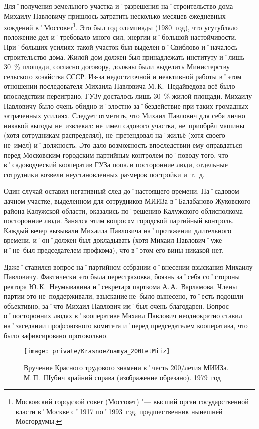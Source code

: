 Для˚получения земельного участка и˚разрешения на˚строительство дома Михаилу Павловичу пришлось затратить несколько месяцев ежедневных хождений в˚Моссовет\footnote{Московский городской совет (Моссовет) "--- высший орган государственной власти в˚Москве с˚1917 по˚1993~год, предшественник нынешней Мосгордумы.}. Это был год олимпиады (1980~год), что усугубляло положение дел и˚требовало много сил, энергии и˚большой настойчивости. При˚больших усилиях такой участок был выделен в˚Свиблово и˚началось строительство дома. Жилой дом должен был принадлежать институту и˚лишь 30~\% площади, согласно договору, должны были выделить Министерству сельского хозяйства СССР. Из-за недостаточной и неактивной работы в˚этом отношении последователя Михаила Павловича М.\,К.~Недайведова всё было впоследствии переиграно. ГУЗу досталось лишь 30~\% жилой площади. Михаилу Павловичу было очень обидно и˚злостно за˚бездействие при таких громадных затраченных усилиях. Следует отметить, что Михаил Павлович для себя лично никакой выгоды не~извлекал: не~имел садового участка, не~приобрёл машины (хотя сотрудникам распределял), не~претендовал на˚жильё (хотя своего не~имел) и˚должность. Это дало возможность впоследствии ему оправдаться перед Московским городским партийным контролем по˚поводу того, что в˚садоводческий кооператив ГУЗа попали посторонние люди, отдельные сотрудники возвели неустановленных размеров постройки и~т.~д. 

Один случай оставил негативный след до˚настоящего времени. На˚садовом дачном участке, выделенном для сотрудников МИИЗа в˚Балабаново Жуковского района Калужской области, оказались по˚решению Калужского облисполкома посторонние люди. Занялся этим вопросом городской партийный контроль. Каждый вечер вызывали Михаила Павловича на˚протяжении длительного времени, и˚он˚должен был докладывать (хотя Михаил Павлович˚уже и˚не~был председателем профкома), что в˚этом его вины никакой нет.

Даже˚ставился вопрос на˚партийном собрании о˚внесении взыскания Михаилу Павловичу. Фактически это была перестраховка, боязнь за˚себя со˚стороны ректора Ю.\,К.~Неумывакина и˚секретаря парткома А.\,А.~Варламова. Члены партии это не~поддерживали, взыскание не~было вынесено, то˚есть подошли объективно, за˚что Михаил Павлович им˚был очень благодарен. Вопрос о˚посторонних людях в˚кооперативе Михаил Павлович неоднократно ставил на˚заседании профсоюзного комитета и˚перед председателем кооператива, что было зафиксировано протокольно.

\begin{figure}[h]
\texttt{[image: private/KrasnoeZnamya\_200LetMiiz]}
\caption[Вручение Красного трудового знамени в˚честь 200\=/летия МИИЗа. М.\,П.~Шубич крайний справа (изображение обрезано). 1979~год]{Вручение Красного трудового знамени в˚честь 200\=/летия МИИЗа. М.\,П.~Шубич крайний справа (изображение обрезано). 1979~год\footnotemark}
\label{fig:KrasnoeZnamya_200LetMiiz}
\end{figure}

